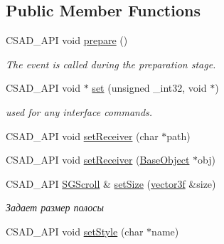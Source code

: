 \subsection*{Public Member Functions}
\begin{DoxyCompactItemize}
\item 
\hypertarget{classcsad_1_1_s_g_scroll_ace749f35d40557d46889cee3114d57d0}{C\-S\-A\-D\-\_\-\-A\-P\-I void \hyperlink{classcsad_1_1_s_g_scroll_ace749f35d40557d46889cee3114d57d0}{prepare} ()}\label{classcsad_1_1_s_g_scroll_ace749f35d40557d46889cee3114d57d0}

\begin{DoxyCompactList}\small\item\em The event is called during the preparation stage. \end{DoxyCompactList}\item 
\hypertarget{classcsad_1_1_s_g_scroll_a7205cce98300f63dbf3f4fdf0ee9b38e}{C\-S\-A\-D\-\_\-\-A\-P\-I void $\ast$ \hyperlink{classcsad_1_1_s_g_scroll_a7205cce98300f63dbf3f4fdf0ee9b38e}{set} (unsigned \-\_\-int32, void $\ast$)}\label{classcsad_1_1_s_g_scroll_a7205cce98300f63dbf3f4fdf0ee9b38e}

\begin{DoxyCompactList}\small\item\em used for any interface commands. \end{DoxyCompactList}\item 
C\-S\-A\-D\-\_\-\-A\-P\-I void \hyperlink{classcsad_1_1_s_g_scroll_a5fb534de72e2730233871692f88e9e95}{set\-Receiver} (char $\ast$path)
\item 
C\-S\-A\-D\-\_\-\-A\-P\-I void \hyperlink{classcsad_1_1_s_g_scroll_a0e6130ea34137b0c3a5642808b080942}{set\-Receiver} (\hyperlink{classcsad_1_1_base_object}{Base\-Object} $\ast$obj)
\item 
\hypertarget{classcsad_1_1_s_g_scroll_aa2d6ef27b51ae6450eeb04fafd13b608}{C\-S\-A\-D\-\_\-\-A\-P\-I \hyperlink{classcsad_1_1_s_g_scroll}{S\-G\-Scroll} \& \hyperlink{classcsad_1_1_s_g_scroll_aa2d6ef27b51ae6450eeb04fafd13b608}{set\-Size} (\hyperlink{classbt_1_1vector3f}{vector3f} \&size)}\label{classcsad_1_1_s_g_scroll_aa2d6ef27b51ae6450eeb04fafd13b608}

\begin{DoxyCompactList}\small\item\em Задает размер полосы \end{DoxyCompactList}\item 
\hypertarget{classcsad_1_1_s_g_scroll_a44a79019f584b84eeca4165a33b8272d}{C\-S\-A\-D\-\_\-\-A\-P\-I void \hyperlink{classcsad_1_1_s_g_scroll_a44a79019f584b84eeca4165a33b8272d}{set\-Style} (char $\ast$name)}\label{classcsad_1_1_s_g_scroll_a44a79019f584b84eeca4165a33b8272d}


\end{DoxyCompactItemize}
